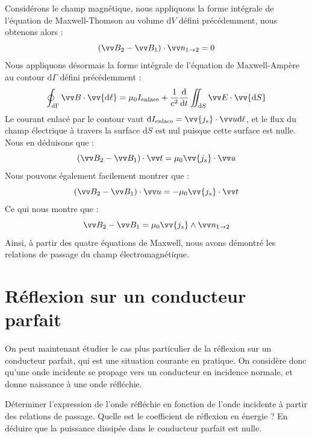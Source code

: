 \documentclass[11pt,fleqn]{book} %
\newcommand{\dd}{\mathrm{d}}
\begin{document}
\begin{demonstration}
	Considérons le champ magnétique, nous appliquons la forme intégrale de l'équation de Maxwell-Thomson au volume $\dd V$ défini précédemment, nous obtenons alors :
	\begin{equation}
		(\vv B_2 - \vv B_1) \cdot \vv n_{1 \to 2} = 0
	\end{equation}
	Nous appliquons désormais la forme intégrale de l'équation de Maxwell-Ampère au contour $\dd \Gamma$ défini précédemment :
	\begin{equation}
		\oint_{\dd \Gamma} \vv B \cdot \vv{\dd \ell} = \mu_0 I_{\rm enlace} + \frac{1}{c^2} \frac{\dd}{\dd t} \iint_{\dd S} \vv E \cdot \vv{\dd S}
	\end{equation}
	Le courant enlacé par le contour vaut $\dd I_{\rm enlace} = \vv{j_s} \cdot \vv u \dd \ell$, et le flux du champ électrique à travers la surface $\dd S$ est nul puisque cette surface est nulle. Nous en déduisons que :
	\begin{equation}
		(\vv B_2 - \vv B_1) \cdot \vv t = \mu_0 \vv{j_s} \cdot \vv u
	\end{equation}
	Nous pouvons également facilement montrer que :
	\begin{equation}
		(\vv B_2 - \vv B_1) \cdot \vv u = -\mu_0 \vv{j_s} \cdot \vv t
	\end{equation}
	Ce qui nous montre que :
	\begin{equation}
		\vv B_2 - \vv B_1 = \mu_0 \vv{j_s} \wedge \vv n_{1 \to 2}
	\end{equation}
	Ainsi, à partir des quatre équations de Maxwell, nous avons démontré les relations de passage du champ électromagnétique.
\end{demonstration}

\section{Réflexion sur un conducteur parfait}

On peut maintenant étudier le cas plus particulier de la réflexion sur un conducteur parfait, qui est une situation courante en pratique. On considère donc qu'une onde incidente se propage vers un conducteur en incidence normale, et donne naissance à une onde réfléchie. 
\begin{capex}
	Déterminer l'expression de l'onde réfléchie en fonction de l'onde incidente à partir des relations de passage. Quelle est le coefficient de réflexion en énergie ? En déduire que la puissance dissipée dans le conducteur parfait est nulle.
\end{capex}
\end{document}
